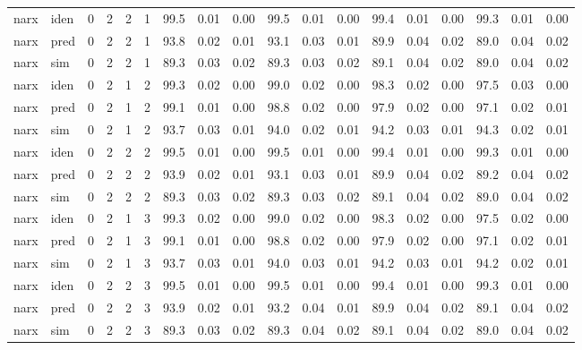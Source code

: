 \begin{landscape}
\begin{center}
\begin{longtable}{ll|cccc|ccc|ccc|ccc|ccc}
 \hline 
narx & iden & 0 & 2 & 2 & 1 & 99.5 & 0.01 & 0.00 & 99.5 & 0.01 & 0.00 & 99.4 & 0.01 & 0.00 & 99.3 & 0.01 & 0.00 \\ 
narx & pred & 0 & 2 & 2 & 1 & 93.8 & 0.02 & 0.01 & 93.1 & 0.03 & 0.01 & 89.9 & 0.04 & 0.02 & 89.0 & 0.04 & 0.02 \\ 
narx & sim  & 0 & 2 & 2 & 1 & 89.3 & 0.03 & 0.02 & 89.3 & 0.03 & 0.02 & 89.1 & 0.04 & 0.02 & 89.0 & 0.04 & 0.02 \\ 
 \hline 
narx & iden & 0 & 2 & 1 & 2 & 99.3 & 0.02 & 0.00 & 99.0 & 0.02 & 0.00 & 98.3 & 0.02 & 0.00 & 97.5 & 0.03 & 0.00 \\ 
narx & pred & 0 & 2 & 1 & 2 & 99.1 & 0.01 & 0.00 & 98.8 & 0.02 & 0.00 & 97.9 & 0.02 & 0.00 & 97.1 & 0.02 & 0.01 \\ 
narx & sim  & 0 & 2 & 1 & 2 & 93.7 & 0.03 & 0.01 & 94.0 & 0.02 & 0.01 & 94.2 & 0.03 & 0.01 & 94.3 & 0.02 & 0.01 \\ 
 \hline 
narx & iden & 0 & 2 & 2 & 2 & 99.5 & 0.01 & 0.00 & 99.5 & 0.01 & 0.00 & 99.4 & 0.01 & 0.00 & 99.3 & 0.01 & 0.00 \\ 
narx & pred & 0 & 2 & 2 & 2 & 93.9 & 0.02 & 0.01 & 93.1 & 0.03 & 0.01 & 89.9 & 0.04 & 0.02 & 89.2 & 0.04 & 0.02 \\ 
narx & sim  & 0 & 2 & 2 & 2 & 89.3 & 0.03 & 0.02 & 89.3 & 0.03 & 0.02 & 89.1 & 0.04 & 0.02 & 89.0 & 0.04 & 0.02 \\ 
 \hline 
narx & iden & 0 & 2 & 1 & 3 & 99.3 & 0.02 & 0.00 & 99.0 & 0.02 & 0.00 & 98.3 & 0.02 & 0.00 & 97.5 & 0.02 & 0.00 \\ 
narx & pred & 0 & 2 & 1 & 3 & 99.1 & 0.01 & 0.00 & 98.8 & 0.02 & 0.00 & 97.9 & 0.02 & 0.00 & 97.1 & 0.02 & 0.01 \\ 
narx & sim  & 0 & 2 & 1 & 3 & 93.7 & 0.03 & 0.01 & 94.0 & 0.03 & 0.01 & 94.2 & 0.03 & 0.01 & 94.2 & 0.02 & 0.01 \\ 
 \hline 
narx & iden & 0 & 2 & 2 & 3 & 99.5 & 0.01 & 0.00 & 99.5 & 0.01 & 0.00 & 99.4 & 0.01 & 0.00 & 99.3 & 0.01 & 0.00 \\ 
narx & pred & 0 & 2 & 2 & 3 & 93.9 & 0.02 & 0.01 & 93.2 & 0.04 & 0.01 & 89.9 & 0.04 & 0.02 & 89.1 & 0.04 & 0.02 \\ 
narx & sim  & 0 & 2 & 2 & 3 & 89.3 & 0.03 & 0.02 & 89.3 & 0.04 & 0.02 & 89.1 & 0.04 & 0.02 & 89.0 & 0.04 & 0.02 \\ 
 \hline 
\end{longtable} 
\normalsize \end{center} 
 \end{landscape}